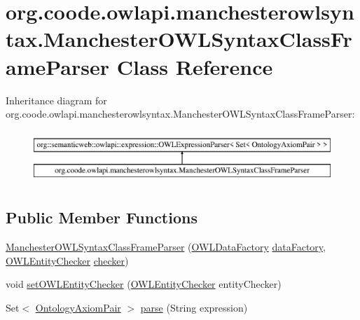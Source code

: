 \hypertarget{classorg_1_1coode_1_1owlapi_1_1manchesterowlsyntax_1_1_manchester_o_w_l_syntax_class_frame_parser}{\section{org.\-coode.\-owlapi.\-manchesterowlsyntax.\-Manchester\-O\-W\-L\-Syntax\-Class\-Frame\-Parser Class Reference}
\label{classorg_1_1coode_1_1owlapi_1_1manchesterowlsyntax_1_1_manchester_o_w_l_syntax_class_frame_parser}
}
Inheritance diagram for org.\-coode.\-owlapi.\-manchesterowlsyntax.\-Manchester\-O\-W\-L\-Syntax\-Class\-Frame\-Parser\-:\begin{figure}[H]
\begin{center}
\leavevmode
\includegraphics[height=2.000000cm]{classorg_1_1coode_1_1owlapi_1_1manchesterowlsyntax_1_1_manchester_o_w_l_syntax_class_frame_parser}
\end{center}
\end{figure}
\subsection*{Public Member Functions}
\begin{DoxyCompactItemize}
\item 
\hyperlink{classorg_1_1coode_1_1owlapi_1_1manchesterowlsyntax_1_1_manchester_o_w_l_syntax_class_frame_parser_aa57287f3657e4b005e5299793bb5aba3}{Manchester\-O\-W\-L\-Syntax\-Class\-Frame\-Parser} (\hyperlink{interfaceorg_1_1semanticweb_1_1owlapi_1_1model_1_1_o_w_l_data_factory}{O\-W\-L\-Data\-Factory} \hyperlink{classorg_1_1coode_1_1owlapi_1_1manchesterowlsyntax_1_1_manchester_o_w_l_syntax_class_frame_parser_a7c0f6c1da45f4620640609d9b4227c2b}{data\-Factory}, \hyperlink{interfaceorg_1_1semanticweb_1_1owlapi_1_1expression_1_1_o_w_l_entity_checker}{O\-W\-L\-Entity\-Checker} \hyperlink{classorg_1_1coode_1_1owlapi_1_1manchesterowlsyntax_1_1_manchester_o_w_l_syntax_class_frame_parser_aaf2f055752305d339ee0d0a9d739d515}{checker})
\item 
void \hyperlink{classorg_1_1coode_1_1owlapi_1_1manchesterowlsyntax_1_1_manchester_o_w_l_syntax_class_frame_parser_a25dbbd7a6103e0f1a8f7a65167f4f9c4}{set\-O\-W\-L\-Entity\-Checker} (\hyperlink{interfaceorg_1_1semanticweb_1_1owlapi_1_1expression_1_1_o_w_l_entity_checker}{O\-W\-L\-Entity\-Checker} entity\-Checker)
\item 
Set$<$ \hyperlink{classorg_1_1coode_1_1owlapi_1_1manchesterowlsyntax_1_1_ontology_axiom_pair}{Ontology\-Axiom\-Pair} $>$ \hyperlink{classorg_1_1coode_1_1owlapi_1_1manchesterowlsyntax_1_1_manchester_o_w_l_syntax_class_frame_parser_ad9d893ec99921350a9829cd85693f9e9}{parse} (String expression)
\end{DoxyCompactItemize}
